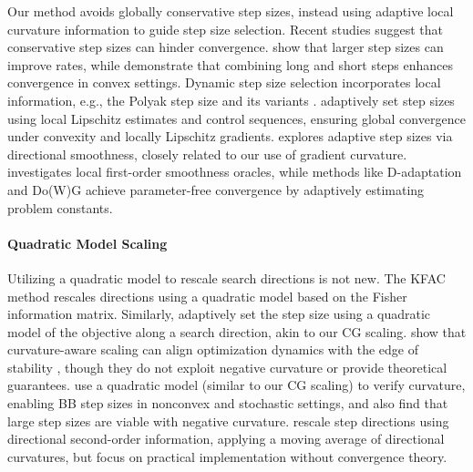 Our method avoids globally conservative step sizes, instead using adaptive local curvature information to guide step size selection. Recent studies suggest that conservative step sizes can hinder convergence. \citet{grimmerProvablyFasterGradient2024} show that larger step sizes can improve rates, while \citet{altschulerAccelerationStepsizeHedging2023} demonstrate that combining long and short steps enhances convergence in convex settings. Dynamic step size selection incorporates local information, e.g., the Polyak step size \citep{polyakIntroductionOptimization1987} and its variants \citep{loizouStochasticPolyakStepsize2021,orvieto2022dynamics,oikonomou2024stochastic}. \citet{malitskyAdaptiveGradientDescent2020,malitskyAdaptiveProximalGradient2024} adaptively set step sizes using local Lipschitz estimates and control sequences, ensuring global convergence under convexity and locally Lipschitz gradients. \citet{mishkinDirectionalSmoothnessGradient2024} explores adaptive step sizes via directional smoothness, closely related to our use of gradient curvature. \citet{berahasNonUniformSmoothnessGradient2023} investigates local first-order smoothness oracles, while methods like D-adaptation \cite{defazioLearningRateFreeLearningDAdaptation2023,mishchenkoProdigyExpeditiouslyAdaptive2024} and Do(W)G \cite{ivgiDoGSGDsBest2023,khaledDoWGUnleashedEfficient2024} achieve parameter-free convergence by adaptively estimating problem constants.

\vspace{-1mm}
\paragraph{Quadratic Model Scaling } 

Utilizing a quadratic model to rescale search directions is not new. The KFAC method \citep{martensOptimizingNeuralNetworks2020} rescales directions using a quadratic model based on the Fisher information matrix. Similarly,  \citet{rouletSteppingEdgeCurvature2024} adaptively set the step size using a quadratic model of the objective along a search direction, akin to our CG scaling. \citet{rouletSteppingEdgeCurvature2024} show that curvature-aware scaling can align optimization dynamics with the edge of stability \citep{cohenGradientDescentNeural2022}, though they do not exploit negative curvature or provide theoretical guarantees. \citet{casteraSecondOrderStepSizeTuning2022} use a quadratic model (similar to our CG scaling) to verify curvature, enabling BB step sizes in nonconvex and stochastic settings, and also find that large step sizes are viable with negative curvature. \citet{degournay2022adaptivescalinglearningrate} rescale step directions using directional second-order information, applying a moving average of directional curvatures, but focus on practical implementation without convergence theory.